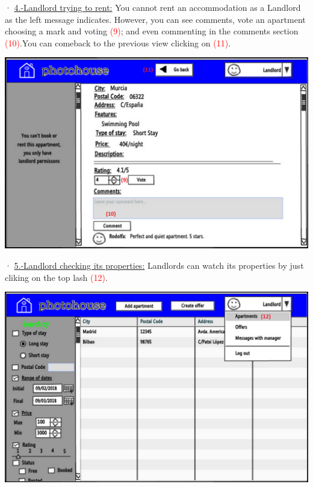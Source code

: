 \documentclass[12pt]{article}
\begin{document}
{· \underline{4.-Landlord trying to rent:} You cannot rent an accommodation as a Landlord as the left message indicates. However, you can see comments, vote an apartment choosing a mark and voting \textcolor{red}{(9)}; and even commenting in the comments section \textcolor{red}{(10)}.You can comeback to the previous view clicking on \textcolor{red}{(11)}.\\
\begin{center}
	\includegraphics[scale=.7]{landlord_renting.PNG}
\end{center}

\newpage
· \underline{5.-Landlord checking its properties:} Landlords can watch its properties by just cliking on the top lash \textcolor{red}{(12)}.
\begin{center}
	\includegraphics[scale=.7]{landlord_apartments.PNG}
\end{center}


}
\end{document}
